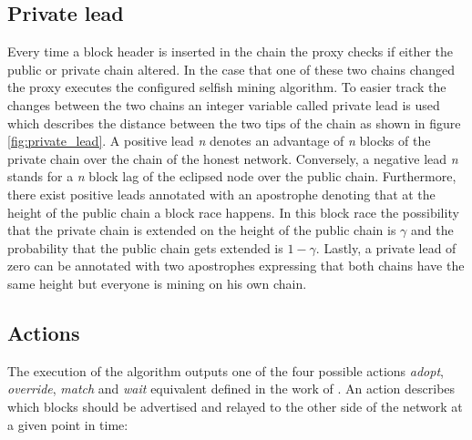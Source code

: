 \subsection{Private lead}

Every time a block header is inserted in the chain the proxy checks if either the public or private chain altered.
In the case that one of these two chains changed the proxy executes the configured selfish mining algorithm.
To easier track the changes between the two chains an integer variable called private lead is used which describes the distance between the two tips of the chain as shown in figure \ref{fig:private_lead}.
A positive lead \textit{n} denotes an advantage of \textit{n} blocks of the private chain over the chain of the honest network.
Conversely, a negative lead \textit{n} stands for a \textit{n} block lag of the eclipsed node over the public chain.
Furthermore, there exist positive leads annotated with an apostrophe denoting that at the height of the public chain a block race happens.
In this block race the possibility that the private chain is extended on the height of the public chain is $\gamma$ and the probability that the public chain gets extended is $1 - \gamma$.
Lastly, a private lead of zero can be annotated with two apostrophes expressing that both chains have the same height but everyone is mining on his own chain.

\subsection{Actions}

The execution of the algorithm outputs one of the four possible actions \textit{adopt}, \textit{override}, \textit{match} and \textit{wait} equivalent defined in the work of \cite{sapirshtein2016optimal}.
An action describes which blocks should be advertised and relayed to the other side of the network at a given point in time:

